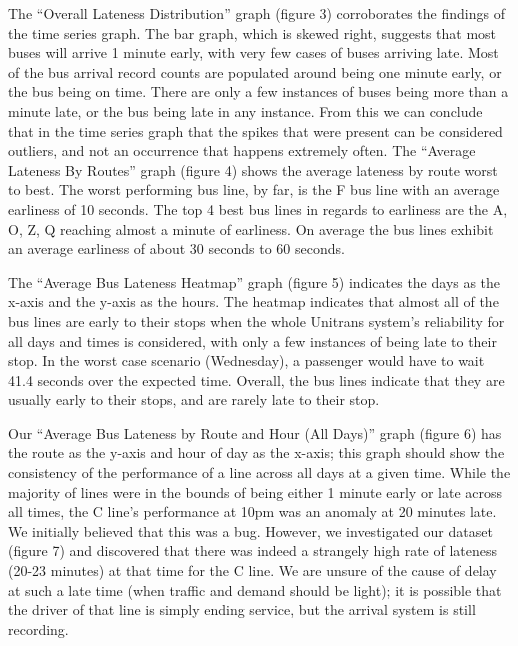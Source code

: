 \documentclass[]{article}
\begin{document}
	The “Overall Lateness Distribution” graph (figure 3) corroborates the findings of the time series graph. The bar graph, which is skewed right, suggests that most buses will arrive 1 minute early, with very few cases of buses arriving late. Most of the bus arrival record counts are populated around being one minute early, or the bus being on time. There are only a few instances of buses being more than a minute late, or the bus being late in any instance. From this we can conclude that in the time series graph that the spikes that were present can be considered outliers, and not an occurrence that happens extremely often.
	The “Average Lateness By Routes” graph (figure 4) shows the average lateness by route worst to best. The worst performing bus line, by far, is the F bus line with an average earliness of 10 seconds. The top 4 best bus lines in regards to earliness are the A, O, Z, Q reaching almost a minute of earliness. On average the bus lines exhibit an average earliness of about 30 seconds to 60 seconds.
	
	The “Average Bus Lateness Heatmap” graph (figure 5) indicates the days as the x-axis and the y-axis as the hours. The heatmap indicates that almost all of the bus lines are early to their stops when the whole Unitrans system’s reliability for all days and times is considered, with only a few instances of being late to their stop. In the worst case scenario (Wednesday), a passenger would have to wait 41.4 seconds over the expected time. Overall, the bus lines indicate that they are usually early to their stops, and are rarely late to their stop.
	
	Our “Average Bus Lateness by Route and Hour (All Days)” graph (figure 6) has the route as the y-axis and hour of day as the x-axis; this graph should show the consistency of the performance of a line across all days at a given time. While the majority of lines were in the bounds of being either 1 minute early or late across all times, the C line’s performance at 10pm was an anomaly at 20 minutes late. We initially believed that this was a bug. However, we investigated our dataset (figure 7) and discovered that there was indeed a strangely high rate of lateness (20-23 minutes) at that time for the C line. We are unsure of the cause of delay at such a late time (when traffic and demand should be light); it is possible that the driver of that line is simply ending service, but the arrival system is still recording. 
	
\end{document}
